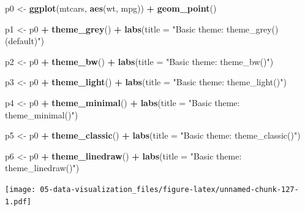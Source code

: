 \documentclass[
  11pt,
]{krantz}
\newenvironment{Shaded}{\begin{snugshade}}{\end{snugshade}}
\newcommand{\DataTypeTok}[1]{\textcolor[rgb]{0.27,0.27,0.27}{#1}}
\newcommand{\KeywordTok}[1]{\textcolor[rgb]{0.27,0.27,0.27}{\textbf{#1}}}
\newcommand{\NormalTok}[1]{#1}
\newcommand{\OperatorTok}[1]{\textcolor[rgb]{0.43,0.43,0.43}{\textbf{#1}}}
\newcommand{\StringTok}[1]{\textcolor[rgb]{0.5,0.5,0.5}{#1}}
\begin{document}
\footnotesize

\begin{Shaded}
\begin{Highlighting}[]
\NormalTok{p0 <-}\StringTok{ }\KeywordTok{ggplot}\NormalTok{(mtcars, }\KeywordTok{aes}\NormalTok{(wt, mpg)) }\OperatorTok{+}
\StringTok{  }\KeywordTok{geom_point}\NormalTok{() }

\NormalTok{p1 <-}\StringTok{ }\NormalTok{p0 }\OperatorTok{+}\StringTok{ }\KeywordTok{theme_grey}\NormalTok{() }\OperatorTok{+}\StringTok{ }
\StringTok{  }\KeywordTok{labs}\NormalTok{(}\DataTypeTok{title =} \StringTok{"Basic theme: theme_grey() (default)"}\NormalTok{)}

\NormalTok{p2 <-}\StringTok{ }\NormalTok{p0 }\OperatorTok{+}\StringTok{ }\KeywordTok{theme_bw}\NormalTok{() }\OperatorTok{+}\StringTok{ }
\StringTok{  }\KeywordTok{labs}\NormalTok{(}\DataTypeTok{title =} \StringTok{"Basic theme: theme_bw()"}\NormalTok{)}

\NormalTok{p3 <-}\StringTok{ }\NormalTok{p0 }\OperatorTok{+}\StringTok{ }\KeywordTok{theme_light}\NormalTok{() }\OperatorTok{+}\StringTok{ }
\StringTok{  }\KeywordTok{labs}\NormalTok{(}\DataTypeTok{title =} \StringTok{"Basic theme: theme_light()"}\NormalTok{)}

\NormalTok{p4 <-}\StringTok{ }\NormalTok{p0 }\OperatorTok{+}\StringTok{ }\KeywordTok{theme_minimal}\NormalTok{() }\OperatorTok{+}\StringTok{ }
\StringTok{  }\KeywordTok{labs}\NormalTok{(}\DataTypeTok{title =} \StringTok{"Basic theme: theme_minimal()"}\NormalTok{)}

\NormalTok{p5 <-}\StringTok{ }\NormalTok{p0 }\OperatorTok{+}\StringTok{ }\KeywordTok{theme_classic}\NormalTok{() }\OperatorTok{+}\StringTok{ }
\StringTok{  }\KeywordTok{labs}\NormalTok{(}\DataTypeTok{title =} \StringTok{"Basic theme: theme_classic()"}\NormalTok{)}

\NormalTok{p6 <-}\StringTok{ }\NormalTok{p0 }\OperatorTok{+}\StringTok{ }\KeywordTok{theme_linedraw}\NormalTok{() }\OperatorTok{+}\StringTok{ }
\StringTok{  }\KeywordTok{labs}\NormalTok{(}\DataTypeTok{title =} \StringTok{"Basic theme: theme_linedraw()"}\NormalTok{)}
\end{Highlighting}
\end{Shaded}

\normalsize

\footnotesize

\texttt{[image: 05-data-visualization\_files/figure-latex/unnamed-chunk-127-1.pdf]}

\normalsize
\end{document}
